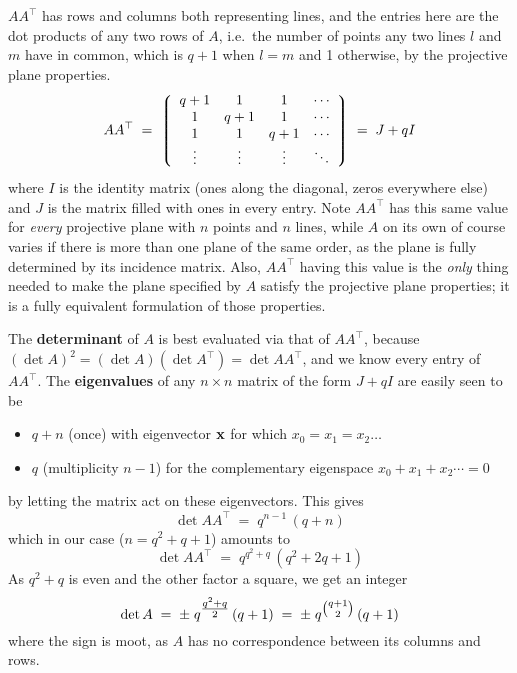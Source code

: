 \documentclass[12pt]{article}
\let\T\textstyle
\begin{document}
$AA^\top$ has rows and columns both representing lines, and the entries
here are the dot products of any two rows of $A$, i.e.\ the number of points
any two lines $l$ and $m$ have in common, which is $q+1$ when $l=m$ and 1
otherwise, by the projective plane properties.\vspace{-10pt}
$$
  AA^\top \;=\;
  \left\lgroup
  \begin{array}{cccc}
          q+1& 1 & 1 &\cdots \\
          1 &q+1& 1 &\cdots \\
          1 & 1 &q+1&\cdots \\
         \vdots&\vdots&\vdots&\ddots 
  \end{array}
  \right\rgroup
  \;=\; J + qI
$$
where $I$ is the identity matrix (ones along the diagonal, zeros everywhere
else) and $J$ is the matrix filled with ones in every entry. Note $AA^\top$
has this same value for {\em every\/} projective plane with $n$ points and $n$ lines,
while $A$ on its own of course varies if there is more than one plane of the
same order, as the plane is fully determined by its incidence matrix. Also,
$AA^\top$ having this value is the {\em only\/} thing needed to make the plane
specified by $A$ satisfy the projective plane properties; it is a fully equivalent
formulation of those properties.

The {\bf determinant} of $A$ is best evaluated via that of $AA^\top$,
because $(\det A)^2 = (\det A)(\det A^\top) = \det AA^\top$, and we know
every entry of $AA^\top$. The {\bf eigenvalues} of any $n\times n$ matrix of
the form $J + qI$ are easily seen to be
%
\begin{itemize}

\item $q+n$ (once) with eigenvector ${\bf x}$ for which $x_0=x_1=x_2\dots$

\item $q$ (multiplicity $n-1$) for the complementary eigenspace
      $x_0+x_1+x_2\cdots=0$

\end{itemize}
%
by letting the matrix act on these eigenvectors. This gives
$$
  \det AA^\top \;=\; q^{n-1}\,(q+n)
$$
which in our case ($n=q^2+q+1$) amounts to
$$
  \det AA^\top \;=\; q^{q^2+q}\,(q^2+2q+1)
$$
As $q^2+q$ is even and the other factor a square, we get an integer
$$
  \det A \;=\; \pm\;q^{\T{q^2+q\over2}}\,(q+1)
         \;=\; \pm\;q^{\T{q+1\choose2}}\,(q+1)
$$
where the sign is moot, as $A$ has no correspondence between its columns and
rows.
\end{document}
